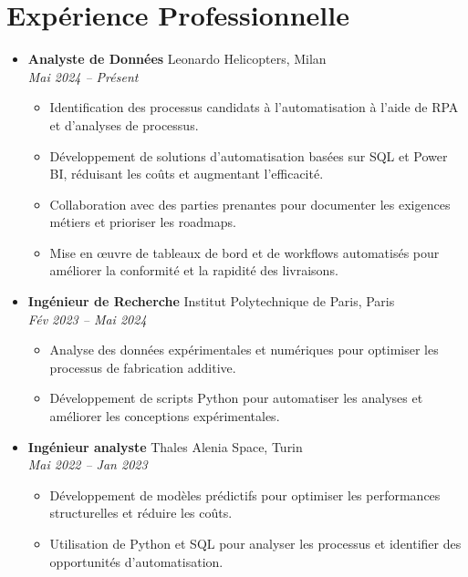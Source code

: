 \documentclass[letterpaper,10.5pt]{article}
\newcommand{\resumeEntry}[4]{
  \item\textbf{#1} \hfill #2\\
  \textit{#3} \hfill \textit{#4}
}
\newcommand{\resumeDescription}[1]{
  \vspace{-3pt}\begin{itemize}[leftmargin=0.2in]
    #1
  \end{itemize}
}
\begin{document}
\section*{Expérience Professionnelle}\vspace{-5pt}
\begin{itemize}[leftmargin=0.2in]
    \resumeEntry{Analyste de Données}{Leonardo Helicopters, Milan}{Mai 2024 -- Présent}{}
    \resumeDescription{
        \item Identification des processus candidats à l'automatisation à l'aide de RPA et d'analyses de processus.
        \item Développement de solutions d'automatisation basées sur SQL et Power BI, réduisant les coûts et augmentant l'efficacité.
        \item Collaboration avec des parties prenantes pour documenter les exigences métiers et prioriser les roadmaps.
        \item Mise en œuvre de tableaux de bord et de workflows automatisés pour améliorer la conformité et la rapidité des livraisons.
    }
    \resumeEntry{Ingénieur de Recherche}{Institut Polytechnique de Paris, Paris}{Fév 2023 -- Mai 2024}{}
    \resumeDescription{
        \item Analyse des données expérimentales et numériques pour optimiser les processus de fabrication additive.
        \item Développement de scripts Python pour automatiser les analyses et améliorer les conceptions expérimentales.
    }
    \resumeEntry{Ingénieur analyste}{Thales Alenia Space, Turin}{Mai 2022 -- Jan 2023}{}
    \resumeDescription{
        \item Développement de modèles prédictifs pour optimiser les performances structurelles et réduire les coûts.
        \item Utilisation de Python et SQL pour analyser les processus et identifier des opportunités d'automatisation.
    }
\end{itemize}

\end{document}
